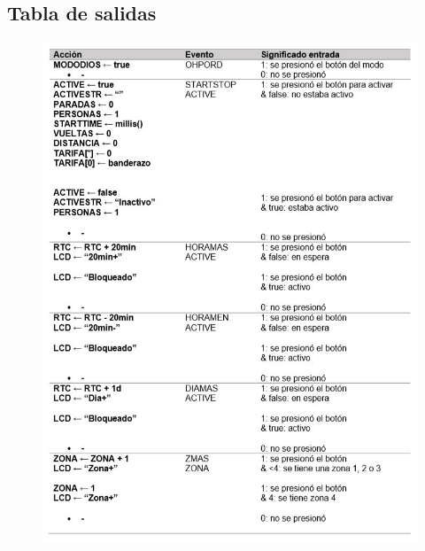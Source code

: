 \documentclass[a4paper,11pt]{article}
\begin{document}
\newpage
\subsection*{Tabla de salidas}

\begin{figure}[h]
	\centering
	\includegraphics{images/tabla1.jpg}
	\end{figure}
	\newpage
\end{document}
